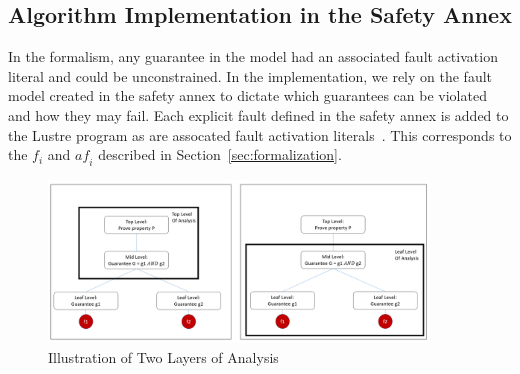 \subsection{Algorithm Implementation in the Safety Annex}
\label{sec:impl}
In the formalism, any guarantee in the model had an associated fault activation literal and could be unconstrained. In the implementation, we rely on the fault model created in the safety annex to dictate which guarantees can be violated and how they may fail. Each explicit fault defined in the safety annex is added to the Lustre program as are assocated fault activation literals~\cite{Stewart17:IMBSA,stewart2020safety}. This corresponds to the $f_i$ and $\mathit{af}_i$ described in Section~\ref{sec:formalization}. 

\begin{figure}[h!]
	\begin{center}
		\includegraphics[width=0.9\textwidth]{images/twoLevels.PNG}
	\end{center}
	\vspace{-2em}
	\caption{Illustration of Two Layers of Analysis}
	\label{fig:layers}
\end{figure}

